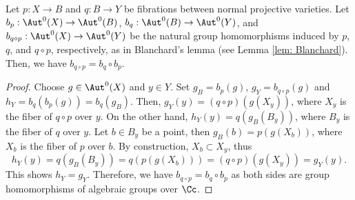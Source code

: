 \documentclass[11pt]{amsart}
\begin{document}
\begin{lemma}\label{lem: composition of Blanchard}
Let $p: X \to B$ and $q: B \to Y$ be fibrations between normal projective varieties. Let $b_p: \Aut^0(X) \to \Aut^0(B)$, $b_q: \Aut^0(B) \to \Aut^0(Y)$, and $b_{q\circ p}: \Aut^0(X) \to \Aut^0(Y)$ be the natural group homomorphisms induced by $p$, $q$, and $q \circ p$, respectively, as in Blanchard's lemma (see Lemma \ref{lem: Blanchard}). Then, we have $b_{q\circ p} = b_q \circ b_p$.
\end{lemma}
\begin{proof}
    Choose $g\in \Aut^0(X)$ and $y\in Y$. Set $g_B= b_p(g)$, $g_Y=b_{q\circ p}(g)$ and $h_Y=b_q(b_p(g))=b_q(g_B)$. Then, $g_Y(y) = (q\circ p)(g(X_y))$, where $X_y$ is the fiber of $q\circ p$ over $y$. On the other hand, $h_Y(y) = q(g_B(B_y))$, where $B_y$ is the fiber of $q$ over $y$. Let $b\in B_y$ be a point, then $g_B(b)=p(g(X_b))$, where $X_b$ is the fiber of $p$ over $b$. By construction, $X_b \subset X_y$, thus
    \[
    h_Y(y) = q(g_B(B_y))= q(p(g(X_b)))=(q\circ p)(g(X_y))=g_Y(y).
    \] This shows $h_Y = g_Y$. Therefore, we have $b_{q\circ p} = b_q \circ b_p$ as both sides are group homomorphisms of algebraic groups over $\Cc$.
\end{proof}
\end{document}
